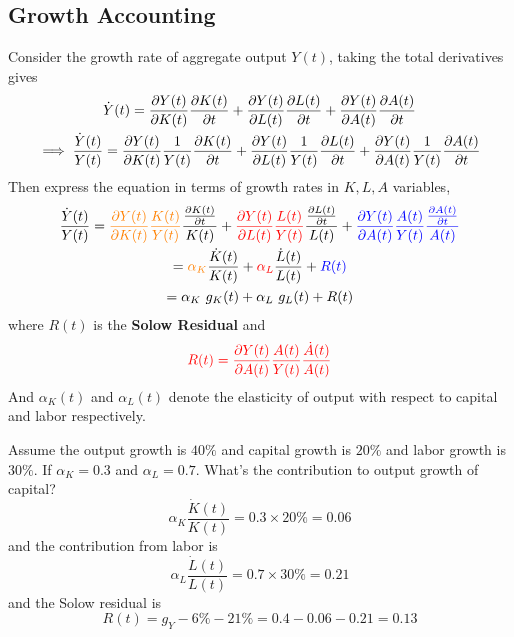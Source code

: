 \documentclass[11pt]{article}
\begin{document}
	    \subsection{Growth Accounting}
	    \par Consider the growth rate of aggregate output $Y(t)$, taking the total derivatives gives
	    \begin{gather}
	    	\dot{Y}(t) = \frac{\partial{Y(t)}}{\partial{K(t)}} \frac{\partial{K(t)}}{\partial{t}} + \frac{\partial{Y(t)}}{\partial{L(t)}} \frac{\partial{L(t)}}{\partial{t}} + \frac{\partial{Y(t)}}{\partial{A(t	)}}\frac{\partial{A(t)}}{\partial{t}} \\
	    	\implies 
	    	\frac{\dot{Y}(t)}{Y(t)} = \frac{\partial{Y(t)}}{\partial{K(t)}} \frac{1}{Y(t)} \frac{\partial{K(t)}}{\partial{t}} + \frac{\partial{Y(t)}}{\partial{L(t)}} \frac{1}{Y(t)} \frac{\partial{L(t)}}{\partial{t}} + \frac{\partial{Y(t)}}{\partial{A(t)}} \frac{1}{Y(t)} \frac{\partial{A(t)}}{\partial{t}} 
	    \end{gather}
	    Then express the equation in terms of growth rates in $K, L, A$ variables,
	    \begin{gather}
	    	\frac{\dot{Y}(t)}{Y(t)} = \textcolor{orange}{\frac{\partial{Y(t)}}{\partial{K(t)}} \frac{K(t)}{Y(t)}}\frac{\frac{\partial{K(t)}}{\partial{t}}}{K(t)} 
	    	+ \textcolor{red}{\frac{\partial{Y(t)}}{\partial{L(t)}} \frac{L(t)}{Y(t)}} \frac{\frac{\partial{L(t)}}{\partial{t}}}{L(t)} 
	    	+ \textcolor{blue}{\frac{\partial{Y(t)}}{\partial{A(t)}} \frac{A(t)}{Y(t)} \frac{\frac{\partial{A(t)}}{\partial{t}}}{A(t)}}
	    	\\
	    	= \textcolor{orange}{\alpha_K} \frac{\dot{K}(t)}{K(t)} 
	    	+ \textcolor{red}{\alpha_L} \frac{\dot{L}(t)}{L(t)} 
	    	+ \textcolor{blue}{R(t)} \\
	    = \alpha_K \ g_K(t) + \alpha_L \ g_L(t) + R(t)
	    \end{gather}
	    where $R(t)$ is the \textbf{Solow Residual} and 
	    \begin{equation}
	    	\textcolor{red}{R(t) = \frac{\partial{Y(t)}}{\partial{A(t)}} \frac{A(t)}{Y(t)} \frac{\dot{A}(t)}{A(t)}}
	    \end{equation}
	    And $\alpha_K(t)$ and $\alpha_L(t)$ denote the elasticity of output with respect to capital and labor respectively.
	    
	    \begin{example}
	    	Assume the output growth is $40\%$ and capital growth is $20\%$ and labor growth is $30\%$. If $\alpha_K = 0.3$ and $\alpha_L = 0.7$. What's the contribution to output growth of capital?
	    	\[
	    		\alpha_K \frac{\dot{K}(t)}{K(t)} = 0.3 \times 20\% = 0.06
	    	\]
	    	and the contribution from labor is
	    	\[
	    		\alpha_L \frac{\dot{L}(t)}{L(t)} = 0.7 \times 30\% = 0.21
	    	\]
	    	and the Solow residual is 
	    	\[
	    		R(t) = g_Y - 6\% - 21\% = 0.4 - 0.06 - 0.21 = 0.13
	    	\]
	    \end{example}
	    
\end{document}

